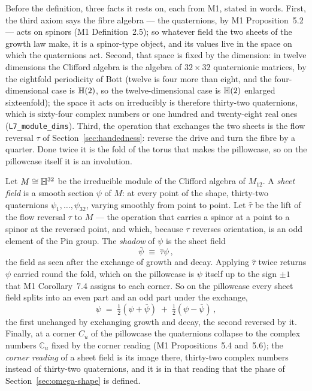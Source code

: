 Before the definition, three facts it rests on, each from M1, stated in
words. First, the third axiom says the fibre algebra --- the quaternions,
by M1 Proposition~5.2 --- acts on spinors (M1 Definition~2.5); so whatever
field the two sheets of the growth law make, it is a spinor-type object,
and its values live in the space on which the quaternions act. Second,
that space is fixed by the dimension: in twelve dimensions the Clifford
algebra is the algebra of $32\times32$ quaternionic matrices, by the
eightfold periodicity of Bott (twelve is four more than eight, and the
four-dimensional case is $\mathbb{H}(2)$, so the twelve-dimensional case is
$\mathbb{H}(2)$ enlarged sixteenfold); the space it acts on irreducibly is
therefore thirty-two quaternions, which is sixty-four complex numbers or
one hundred and twenty-eight real ones (\texttt{L7\_module\_dims}). Third,
the operation that exchanges the two sheets is the flow reversal $\tau$ of
Section~\ref{sec:handedness}: reverse the drive and turn the fibre by a
quarter. Done twice it is the fold of the torus that makes the pillowcase,
so on the pillowcase itself it is an involution.

\begin{definition}\label{def:psi}
Let $M\cong\mathbb{H}^{32}$ be the irreducible module of the Clifford algebra
of $M_{12}$. A \emph{sheet field} is a smooth section $\psi$ of $M$: at
every point of the shape, thirty-two quaternions
$\psi_{1},\dots,\psi_{32}$, varying smoothly from point to point. Let
$\hat\tau$ be the lift of the flow reversal $\tau$ to $M$ --- the operation
that carries a spinor at a point to a spinor at the reversed point, and
which, because $\tau$ reverses orientation, is an odd element of the Pin
group. The \emph{shadow} of $\psi$ is the sheet field
\begin{equation}\label{eq:equivariance}
  \bar\psi\;\equiv\;\hat\tau\psi\,,
\end{equation}
the field as seen after the exchange of growth and decay. Applying
$\hat\tau$ twice returns $\psi$ carried round the fold, which on the
pillowcase is $\psi$ itself up to the sign $\pm1$ that M1 Corollary~7.4
assigns to each corner. So on the pillowcase every sheet field splits into
an even part and an odd part under the exchange,
\[
  \psi\;=\;\tfrac12(\psi+\bar\psi)\;+\;\tfrac12(\psi-\bar\psi)\,,
\]
the first unchanged by exchanging growth and decay, the second reversed
by it. Finally, at a corner $C_{u}$ of the pillowcase the quaternions
collapse to the complex numbers $\mathbb{C}_{u}$ fixed by the corner
reading (M1 Propositions~5.4 and~5.6); the \emph{corner reading} of a
sheet field is its image there, thirty-two complex numbers instead of
thirty-two quaternions, and it is in that reading that the phase of
Section~\ref{sec:omega-shape} is defined.
\end{definition}

